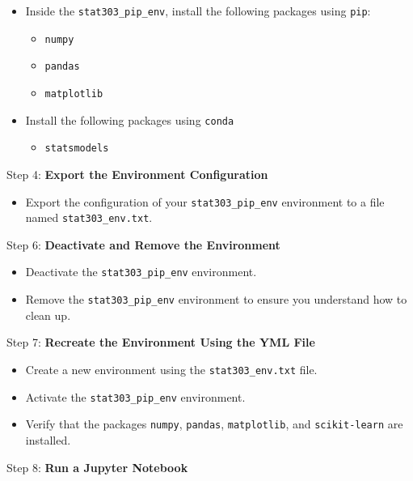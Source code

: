 \documentclass[
  letterpaper,
  DIV=11,
  numbers=noendperiod]{scrreprt}
\providecommand{\tightlist}{%
  \setlength{\itemsep}{0pt}\setlength{\parskip}{0pt}}\usepackage{longtable,booktabs,array}
\begin{document}
\begin{itemize}
\tightlist
\item
  Inside the \texttt{stat303\_pip\_env}, install the following packages
  using \texttt{pip}:

  \begin{itemize}
  \tightlist
  \item
    \texttt{numpy}
  \item
    \texttt{pandas}
  \item
    \texttt{matplotlib}
  \end{itemize}
\item
  Install the following packages using \texttt{conda}

  \begin{itemize}
  \tightlist
  \item
    \texttt{statsmodels}
  \end{itemize}
\end{itemize}

Step 4: \textbf{Export the Environment Configuration}

\begin{itemize}
\tightlist
\item
  Export the configuration of your \texttt{stat303\_pip\_env}
  environment to a file named \texttt{stat303\_env.txt}.
\end{itemize}

Step 6: \textbf{Deactivate and Remove the Environment}

\begin{itemize}
\tightlist
\item
  Deactivate the \texttt{stat303\_pip\_env} environment.
\item
  Remove the \texttt{stat303\_pip\_env} environment to ensure you
  understand how to clean up.
\end{itemize}

Step 7: \textbf{Recreate the Environment Using the YML File}

\begin{itemize}
\tightlist
\item
  Create a new environment using the \texttt{stat303\_env.txt} file.
\item
  Activate the \texttt{stat303\_pip\_env} environment.
\item
  Verify that the packages \texttt{numpy}, \texttt{pandas},
  \texttt{matplotlib}, and \texttt{scikit-learn} are installed.
\end{itemize}

Step 8: \textbf{Run a Jupyter Notebook}
\end{document}

